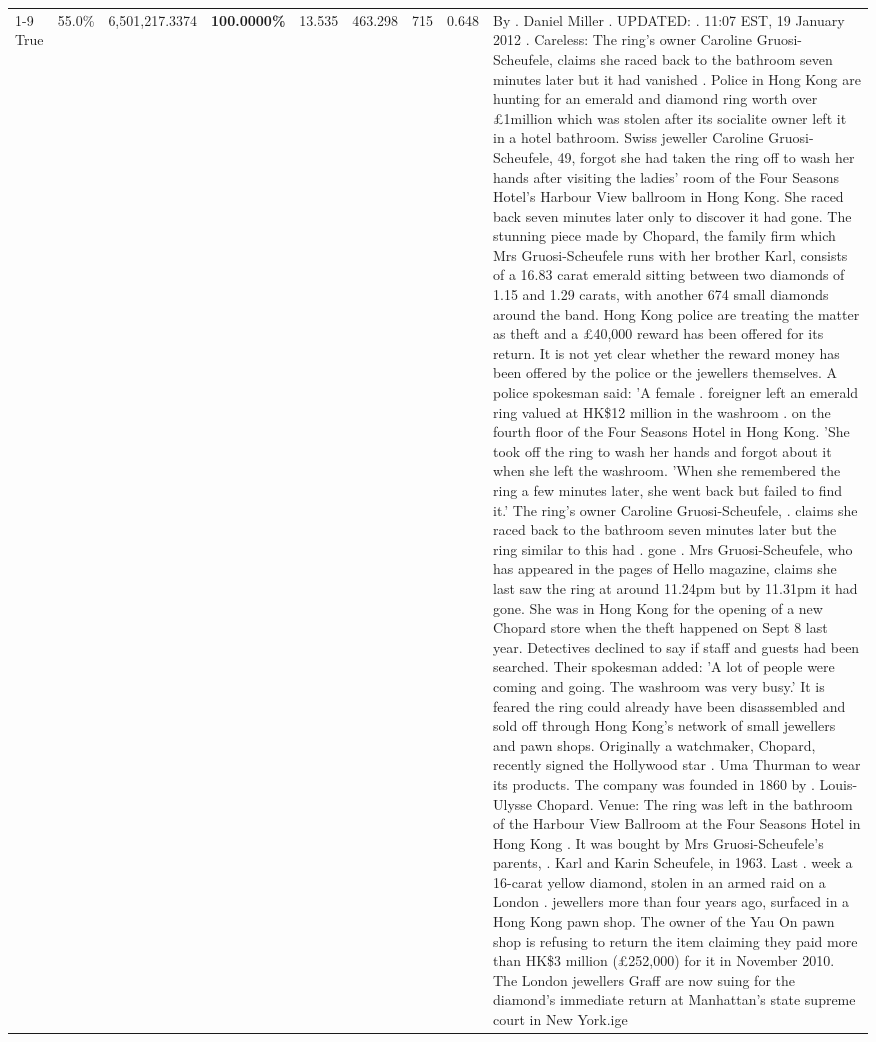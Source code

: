 \begin{table}[H]
\begin{tabular}{lllrlllll}
\cline{1-9}
True & 55.0\% & 6,501,217.3374 & \bfseries \color{red} 100.0000\% & 13.535 & 463.298 & 715 & 0.648 & By . Daniel Miller . UPDATED: . 11:07 EST, 19 January 2012 . Careless: The ring's owner Caroline Gruosi-Scheufele, claims she raced back to the bathroom seven minutes later but it had vanished . Police in Hong Kong are hunting for an emerald and diamond ring worth over £1million which was stolen after its socialite owner left it in a hotel bathroom. Swiss jeweller Caroline Gruosi-Scheufele, 49, forgot she had taken the ring off to wash her hands after visiting the ladies' room of the Four Seasons Hotel's Harbour View ballroom in Hong Kong. She raced back seven minutes later only to discover it had gone. The stunning piece made by Chopard, the family firm which Mrs Gruosi-Scheufele runs with her brother Karl, consists of a 16.83 carat emerald sitting between two diamonds of 1.15 and 1.29 carats, with another 674 small diamonds around the band. Hong Kong police are treating the matter as theft and a £40,000 reward has been offered for its return. It is not yet clear whether the reward money has been offered by the police or the jewellers themselves. A police spokesman said: 'A female . foreigner left an emerald ring valued at HK\$12 million in the washroom . on the fourth floor of the Four Seasons Hotel in Hong Kong. 'She took off the ring to wash her hands and forgot about it when she left the washroom. 'When she remembered the ring a few minutes later, she went back but failed to find it.' The ring's owner Caroline Gruosi-Scheufele, . claims she raced back to the bathroom seven minutes later but the ring similar to this had . gone . Mrs Gruosi-Scheufele, who has appeared in the pages of Hello magazine, claims she last saw the ring at around 11.24pm but by 11.31pm it had gone. She was in Hong Kong for the opening of a new Chopard store when the theft happened on Sept 8 last year. Detectives declined to say if staff and guests had been searched. Their spokesman added: 'A lot of people were coming and going. The washroom was very busy.' It is feared the ring could already have been disassembled and sold off through Hong Kong's network of small jewellers and pawn shops. Originally a watchmaker, Chopard, recently signed the Hollywood star . Uma Thurman to wear its products. The company was founded in 1860 by . Louis-Ulysse Chopard. Venue: The ring was left in the bathroom of the Harbour View Ballroom at the Four Seasons Hotel in Hong Kong . It was bought by Mrs Gruosi-Scheufele's  parents, . Karl and Karin Scheufele, in 1963. Last . week a 16-carat yellow diamond, stolen in an armed raid on a London . jewellers more than four years ago, surfaced in a Hong Kong pawn shop. The owner of the Yau On pawn shop is refusing to return the item claiming they paid more than HK\$3 million (£252,000) for it in November 2010. The London jewellers Graff are now suing for the diamond’s immediate return at Manhattan’s state supreme court in New York.ige \\

\end{tabular}
\end{table}
